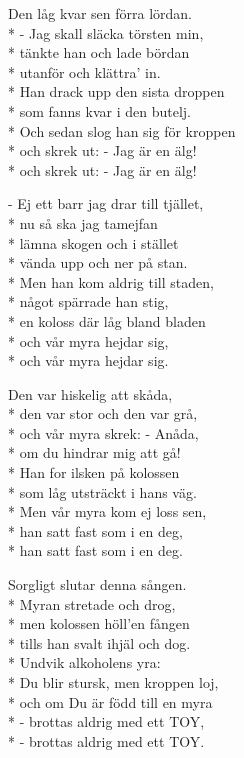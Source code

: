 \begin{SongText}
    \begin{SongVerse}
        Den låg kvar sen förra lördan.\\*%
        - Jag skall släcka törsten min,\\*%
        tänkte han och lade bördan\\*%
        utanför och klättra' in.\\*%
        Han drack upp den sista droppen\\*%
        som fanns kvar i den butelj.\\*%
        Och sedan slog han sig för kroppen\\*%
        och skrek ut: - Jag är en älg!\\*%
        och skrek ut: - Jag är en älg!
    \end{SongVerse}
    \begin{SongVerse}
        - Ej ett barr jag drar till tjället,\\*%
        nu så ska jag tamejfan\\*%
        lämna skogen och i stället\\*%
        vända upp och ner på stan.\\*%
        Men han kom aldrig till staden,\\*%
        något spärrade han stig,\\*%
        en koloss där låg bland bladen\\*%
        och vår myra hejdar sig,\\*%
        och vår myra hejdar sig.
    \end{SongVerse}
    \begin{SongVerse}
        Den var hiskelig att skåda,\\*%
        den var stor och den var grå,\\*%
        och vår myra skrek: - Anåda,\\*%
        om du hindrar mig att gå!\\*%
        Han for ilsken på kolossen\\*%
        som låg utsträckt i hans väg.\\*%
        Men vår myra kom ej loss sen,\\*%
        han satt fast som i en deg,\\*%
        han satt fast som i en deg.
    \end{SongVerse}
    \begin{SongVerse}
        Sorgligt slutar denna sången.\\*%
        Myran stretade och drog,\\*%
        men kolossen höll'en fången\\*%
        tills han svalt ihjäl och dog.\\*%
        Undvik alkoholens yra:\\*%
        Du blir stursk, men kroppen loj,\\*%
        och om Du är född till en myra\\*%
        - brottas aldrig med ett TOY,\\*%
        - brottas aldrig med ett TOY.
    \end{SongVerse}
\end{SongText}
